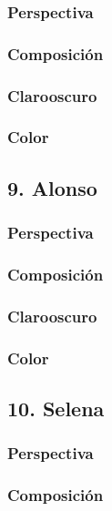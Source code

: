 \documentclass[12pt]{article}
\begin{document}
        \subsubsection{Perspectiva}
    
        \subsubsection{Composición}
    
        \subsubsection{Clarooscuro}
    
        \subsubsection{Color}
    \subsection{9. Alonso}
        \subsubsection{Perspectiva}
    
        \subsubsection{Composición}
    
        \subsubsection{Clarooscuro}
    
        \subsubsection{Color}
    \subsection{10. Selena}
        \subsubsection{Perspectiva}
    
        \subsubsection{Composición}
    
\end{document}
